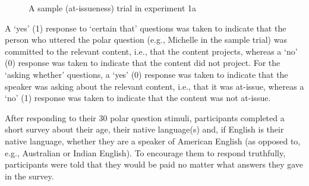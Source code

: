 \documentclass[11pt,fleqn]{article}
\newcommand{\6}{\mbox{$[\hspace*{-.6mm}[$}}
\newcommand{\9}{\mbox{$]\hspace*{-.6mm}]$}}
\begin{document}
\begin{figure}[!h]
\begin{center}
\end{center}
\caption{A sample (at-issueness) trial in experiment 1a}\label{f-trial-exp1}
\end{figure}

A `yes' (1) response to `certain that' questions was taken to indicate that the person who uttered the polar question (e.g., Michelle in the sample trial) was committed to the relevant content, i.e., that the content projects, whereas a `no' (0) response was taken to indicate that the content did not project. For the `asking whether' questions, a `yes' (0) response was taken to indicate that the speaker was asking about the relevant content, i.e., that it was at-issue, whereas a `no' (1) response was taken to indicate that the content was not at-issue. 

After responding to their 30 polar question stimuli, participants completed a short survey about their age, their native language(s) and, if English is their native language, whether they are a speaker of American English (as opposed to, e.g., Australian or Indian English). To encourage them to respond truthfully, participants were told that they would be paid no matter what answers they gave in the survey.
\end{document}
